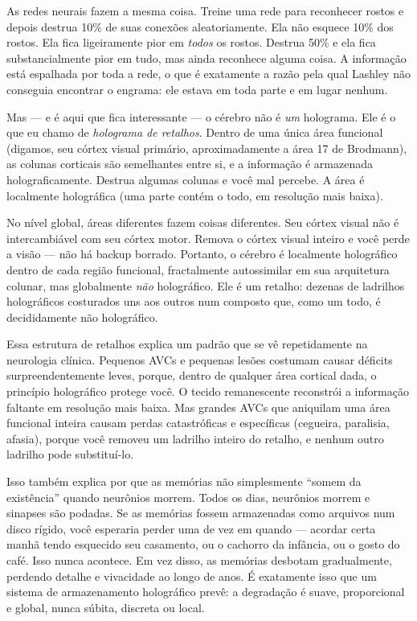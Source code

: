 \documentclass[11pt, twoside, openright]{book}
\begin{document}
As redes neurais fazem a mesma coisa. Treine uma rede para reconhecer rostos e depois destrua 10\% de suas conexões aleatoriamente. Ela não esquece 10\% dos rostos. Ela fica ligeiramente pior em \textit{todos} os rostos. Destrua 50\% e ela fica substancialmente pior em tudo, mas ainda reconhece alguma coisa. A informação está espalhada por toda a rede, o que é exatamente a razão pela qual Lashley não conseguia encontrar o engrama: ele estava em toda parte e em lugar nenhum.

Mas --- e é aqui que fica interessante --- o cérebro não é \textit{um} holograma. Ele é o que eu chamo de \textit{holograma de retalhos}. Dentro de uma única área funcional (digamos, seu córtex visual primário, aproximadamente a área 17 de Brodmann), as colunas corticais são semelhantes entre si, e a informação é armazenada holograficamente. Destrua algumas colunas e você mal percebe. A área é localmente holográfica (uma parte contém o todo, em resolução mais baixa).

No nível global, áreas diferentes fazem coisas diferentes. Seu córtex visual não é intercambiável com seu córtex motor. Remova o córtex visual inteiro e você perde a visão --- não há backup borrado. Portanto, o cérebro é localmente holográfico dentro de cada região funcional, fractalmente autossimilar em sua arquitetura colunar, mas globalmente \textit{não} holográfico. Ele é um retalho: dezenas de ladrilhos holográficos costurados uns aos outros num composto que, como um todo, é decididamente não holográfico.

Essa estrutura de retalhos explica um padrão que se vê repetidamente na neurologia clínica. Pequenos AVCs e pequenas lesões costumam causar déficits surpreendentemente leves, porque, dentro de qualquer área cortical dada, o princípio holográfico protege você. O tecido remanescente reconstrói a informação faltante em resolução mais baixa. Mas grandes AVCs que aniquilam uma área funcional inteira causam perdas catastróficas e específicas (cegueira, paralisia, afasia), porque você removeu um ladrilho inteiro do retalho, e nenhum outro ladrilho pode substituí-lo.

Isso também explica por que as memórias não simplesmente ``somem da existência'' quando neurônios morrem. Todos os dias, neurônios morrem e sinapses são podadas. Se as memórias fossem armazenadas como arquivos num disco rígido, você esperaria perder uma de vez em quando --- acordar certa manhã tendo esquecido seu casamento, ou o cachorro da infância, ou o gosto do café. Isso nunca acontece. Em vez disso, as memórias desbotam gradualmente, perdendo detalhe e vivacidade ao longo de anos. É exatamente isso que um sistema de armazenamento holográfico prevê: a degradação é suave, proporcional e global, nunca súbita, discreta ou local.
\end{document}
